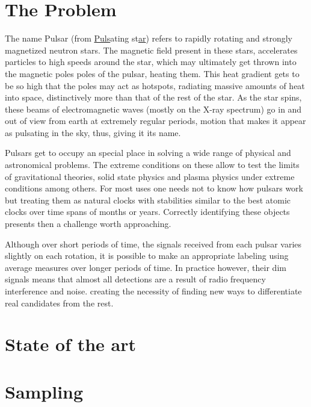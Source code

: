 \documentclass[conference]{IEEEtran}
\begin{document}
\section{The Problem\label{sec:problem}}
The name Pulsar (from \underline{Puls}ating st\underline{ar}) refers to rapidly
rotating and strongly magnetized neutron stars.\cite{pulsar:definition:nasa}
The magnetic field present in these stars, accelerates particles to high
speeds around the star, which may ultimately get thrown into the magnetic
poles poles of the pulsar, heating them. This heat gradient gets to be so high
that the poles may act as hotspots, radiating massive amounts of heat into space,
distinctively more than that of the rest of the star. As the star spins,
these beams of electromagnetic waves (mostly on the X-ray spectrum) go in and out
of view from earth at extremely regular periods, motion that makes it appear as
pulsating in the sky, thus, giving it its name.

Pulsars get to occupy an special place in solving a wide range of physical and
astronomical problems.\cite{pulsar:importance:kramer} The extreme conditions on
these allow to test the limits of gravitational theories, solid state physics and
plasma physics under extreme conditions among others. For most uses one needs
not to know how pulsars work but treating them as natural clocks with stabilities
similar to the best atomic clocks over time spans of months or years. 
Correctly identifying these objects presents then a challenge worth approaching.

Although over short periods of time, the signals received from each pulsar
varies slightly on each rotation,\cite{pulsar:importance:kramer} it is possible
to make an appropriate labeling using average measures over longer periods of time.
In practice however, their dim signals means that almost all detections are a
result of radio frequency interference and noise\cite{pulsar:dataset:explanation:lyon}.
creating the necessity of finding new ways to differentiate real candidates
from the rest.

\section{State of the art\label{sec:state_of_art}}

\todo{}

\section{Sampling\label{sec:sampling}}
\end{document}
